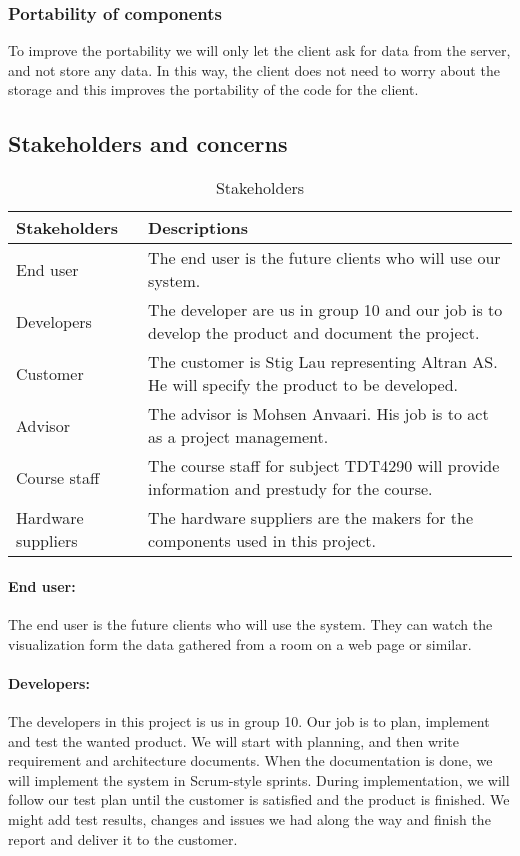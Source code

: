 \documentclass[../document.tex]{subfiles}
\begin{document}
\subsubsection{Portability of components}
To improve the portability we will only let the client ask for data from the server, and not store any data. In this way, the client does not need to worry about the storage and this improves the portability of the code for the client.

\subsection{Stakeholders and concerns}
\begin{table}[H]
	\caption{Stakeholders}
	\begin{tabularx}{\textwidth}{|X|X|}
		\hline
		\textbf{Stakeholders}	& \textbf{Descriptions} \\ \hline
		End user				& The end user is the future clients who will use our system.  \\ \hline
		Developers				& The developer are us in group 10 and our job is to develop the product and document the project.  \\ \hline
		Customer				& The customer is Stig Lau representing Altran AS. He will specify the product to be developed.  \\ \hline
		Advisor					& The advisor is Mohsen Anvaari. His job is to act as a project management.  \\ \hline
		Course staff			& The course staff for subject TDT4290 will provide information and prestudy for the course.  \\ \hline
		Hardware suppliers		& The hardware suppliers are the makers for the components used in this project.  \\ \hline
	\end{tabularx}
\end{table}

\paragraph{End user:} The end user is the future clients who will use the system. They can watch the visualization form the data gathered from a room on a web page or similar. 

\paragraph{Developers:} The developers in this project is us in group 10. Our job is to plan, implement and test the wanted product. We will start with planning, and then write requirement and architecture documents. When the documentation is done, we will implement the system in Scrum-style sprints. During implementation, we will follow our test plan until the customer is satisfied and the product is finished. We might add test results, changes and issues we had along the way and finish the report and deliver it to the customer.
\end{document}
